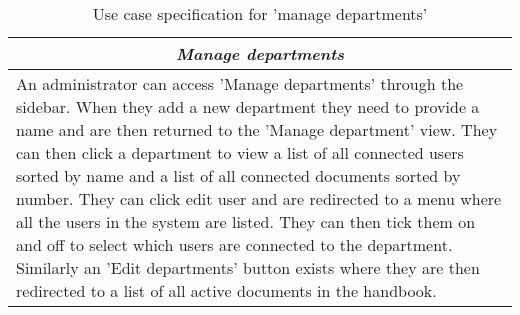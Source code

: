 \begin{table}
\centering
\begin{tabular}{p{12cm}}
\hline
\multicolumn{1}{c}{\textit{\textbf{Manage departments}}} \\
\hline
An administrator can access 'Manage departments' through the sidebar.
When they add a new department they need to provide a name and are then returned to the 'Manage department' view.
They can then click a department to view a list of all connected users sorted by name and a list of all connected documents sorted by number.
They can click edit user and are redirected to a menu where all the users in the system are listed.
They can then tick them on and off to select which users are connected to the department.
Similarly an 'Edit departments' button exists where they are then redirected to a list of all active documents in the handbook.
\\\hline
\end{tabular}
\caption{Use case specification for 'manage departments'}\label{tab:man-dep}
\end{table}